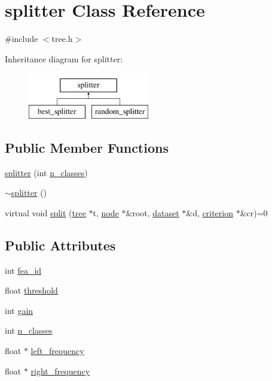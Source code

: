 \hypertarget{classsplitter}{\section{splitter Class Reference}
\label{classsplitter}
}


{\ttfamily \#include $<$tree.\+h$>$}

Inheritance diagram for splitter\+:\begin{figure}[H]
\begin{center}
\leavevmode
\includegraphics[height=2.000000cm]{classsplitter}
\end{center}
\end{figure}
\subsection*{Public Member Functions}
\begin{DoxyCompactItemize}
\item 
\hyperlink{classsplitter_aecf4cc04f2ae39a4a8e13d4049d442cf}{splitter} (int \hyperlink{classsplitter_abfc53538ed65c0afd50aedbf46dff458}{n\+\_\+classes})
\item 
\hyperlink{classsplitter_a221bcb6b6705bb240ef6eea0c95f841a}{$\sim$splitter} ()
\item 
virtual void \hyperlink{classsplitter_af592533ea2d8d16337fa6c8a9a0a6b36}{split} (\hyperlink{classtree}{tree} $\ast$t, \hyperlink{classnode}{node} $\ast$\&root, \hyperlink{classdataset}{dataset} $\ast$\&d, \hyperlink{classcriterion}{criterion} $\ast$\&cr)=0
\end{DoxyCompactItemize}
\subsection*{Public Attributes}
\begin{DoxyCompactItemize}
\item 
int \hyperlink{classsplitter_ad093754efc111ae9dcb00e844b91e979}{fea\+\_\+id}
\item 
float \hyperlink{classsplitter_af40121f8411ad94f3f1968b1d50905ed}{threshold}
\item 
int \hyperlink{classsplitter_ab0fe2776184243f87a291917dca78261}{gain}
\item 
int \hyperlink{classsplitter_abfc53538ed65c0afd50aedbf46dff458}{n\+\_\+classes}
\item 
float $\ast$ \hyperlink{classsplitter_a0a1c53a640e3305eeb32a9586fea657b}{left\+\_\+frequency}
\item 
float $\ast$ \hyperlink{classsplitter_a8e1727de05ad39513dab201d6657aeed}{right\+\_\+frequency}
\end{DoxyCompactItemize}
